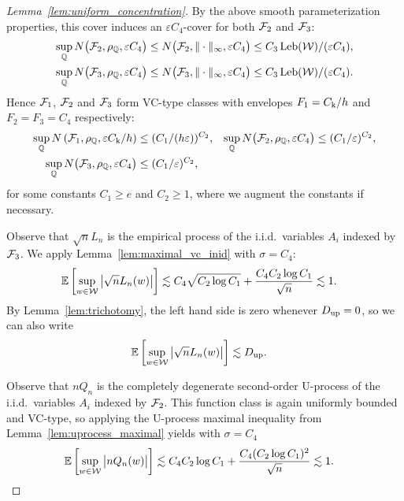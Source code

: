 \begin{proof}[Lemma~\ref{lem:uniform_concentration}]
  By the above smooth parameterization properties,
  this cover induces an
  $\varepsilon C_4$-cover for both $\mathcal{F}_2$ and $\mathcal{F}_3$:
  \begin{align*}
    \sup_{\mathbb{Q}}
    N\big(\mathcal{F}_2, \rho_{\mathbb{Q}}, \varepsilon C_4 \big)
    &\leq
    N\big(\mathcal{F}_2, \|\cdot\|_\infty, \varepsilon C_4 \big)
    \leq
    C_3 \operatorname{Leb}(\mathcal{W}) / (\varepsilon C_4), \\
    \sup_{\mathbb{Q}}
    N\big(\mathcal{F}_3, \rho_{\mathbb{Q}}, \varepsilon C_4 \big)
    &\leq
    N\big(\mathcal{F}_3, \|\cdot\|_\infty, \varepsilon C_4 \big)
    \leq
    C_3 \operatorname{Leb}(\mathcal{W}) / (\varepsilon C_4).
  \end{align*}
  Hence
  $\mathcal{F}_1$,
  $\mathcal{F}_2$ and
  $\mathcal{F}_3$
  form VC-type classes with envelopes
  $F_1 = C_\mathrm{k} / h$ and
  $F_2 = F_3 = C_4$ respectively:
  \begin{align*}
    \sup_{\mathbb{Q}}
    N\left(\mathcal{F}_1, \rho_{\mathbb{Q}},
    \varepsilon C_\mathrm{k} / h \right)
    &\leq
    (C_1/(h\varepsilon))^{C_2},
    &\sup_{\mathbb{Q}}
    N\big(\mathcal{F}_2, \rho_{\mathbb{Q}}, \varepsilon C_4 \big)
    &\leq
    (C_1/\varepsilon)^{C_2}, \\
    \sup_{\mathbb{Q}}
    N\big(\mathcal{F}_3, \rho_{\mathbb{Q}}, \varepsilon C_4 \big)
    &\leq
    (C_1/\varepsilon)^{C_2},
  \end{align*}
  for some constants $C_1 \geq e$ and $C_2 \geq 1$,
  where we augment the constants if necessary.


  Observe that
  $\sqrt{n}L_n$
  is the empirical process of the i.i.d.\ variables $A_i$
  indexed by $\mathcal{F}_3$.
  We apply Lemma~\ref{lem:maximal_vc_inid}
  with $\sigma = C_4$:
  \begin{align*}
    \mathbb{E} \left[
      \sup_{w \in \mathcal{W}}
      \big| \sqrt{n} L_
      n(w) \big|
    \right]
    &\lesssim
    C_4
    \sqrt{C_2 \log C_1}
    +
    \frac{C_4 C_2 \log C_1}
    {\sqrt{n}}
    \lesssim 1.
  \end{align*}
  By Lemma~\ref{lem:trichotomy},
  the left hand side is zero whenever
  $D_{\textup{up}} = 0$,
  so we can also write
  \begin{align*}
    \mathbb{E} \left[
      \sup_{w \in \mathcal{W}}
      \big| \sqrt{n} L_n(w) \big|
    \right]
    &\lesssim
    D_{\textup{up}}.
  \end{align*}


  Observe that $n Q_n$
  is the completely degenerate second-order U-process
  of the i.i.d.\ variables $A_i$
  indexed by $\mathcal{F}_2$.
  This function class is again uniformly bounded
  and VC-type,
  so applying the U-process maximal inequality from
  Lemma~\ref{lem:uprocess_maximal}
  yields with $\sigma = C_4$
  \begin{align*}
    \mathbb{E} \left[
      \sup_{w \in \mathcal{W}}
      \big| n Q_n(w) \big|
    \right]
    &\lesssim
    C_4
    C_2 \log C_1
    +
    \frac{C_4 (C_2 \log C_1)^2}
    {\sqrt{n}}
    \lesssim 1.
  \end{align*}


\end{proof}
